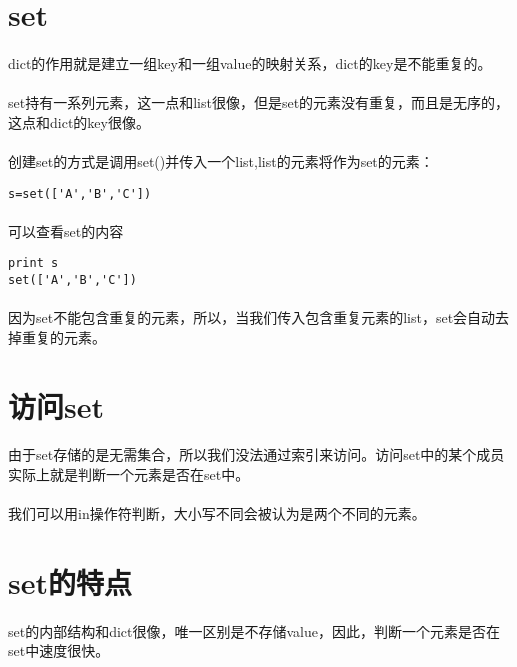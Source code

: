 \documentclass{article}
\begin{document}
\begin{CJK}{UTF8}{gbsn}
\section{set}
\paragraph{}
dict的作用就是建立一组key和一组value的映射关系，dict的key是不能重复的。
\paragraph{}
set持有一系列元素，这一点和list很像，但是set的元素没有重复，而且是无序的，这点和dict的key很像。
\paragraph{}
创建set的方式是调用set()并传入一个list,list的元素将作为set的元素：
\begin{verbatim}
s=set(['A','B','C'])
\end{verbatim}
\paragraph{}
可以查看set的内容
\begin{verbatim}
print s
set(['A','B','C'])
\end{verbatim}
\paragraph{}
因为set不能包含重复的元素，所以，当我们传入包含重复元素的list，set会自动去掉重复的元素。
\section{访问set}
\paragraph{}
由于set存储的是无需集合，所以我们没法通过索引来访问。访问set中的某个成员实际上就是判断一个元素是否在set中。
\paragraph{}
我们可以用in操作符判断，大小写不同会被认为是两个不同的元素。
\section{set的特点}
\paragraph{}
set的内部结构和dict很像，唯一区别是不存储value，因此，判断一个元素是否在set中速度很快。

\end{CJK}
\end{document}

